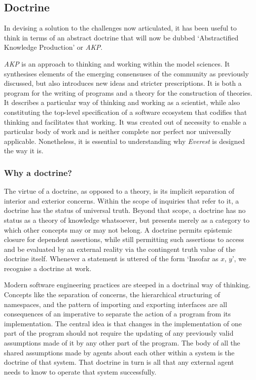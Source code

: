 \documentclass[a4paper,11pt,oneside]{book}
\begin{document}
\subsection{Doctrine}

In devising a solution to the challenges now articulated, it has been useful to think in terms of an abstract doctrine that will now be dubbed `Abstractified Knowledge Production' or \textit{AKP}.

\textit{AKP} is an approach to thinking and working within the model sciences. It synthesises elements of the emerging consensuses of the community as previously discussed, but also introduces new ideas and stricter prescriptions. It is both a program for the writing of programs and a theory for the construction of theories. It describes a particular way of thinking and working as a scientist, while also constituting the top-level specification of a software ecosystem that codifies that thinking and facilitates that working. It was created out of necessity to enable a particular body of work and is neither complete nor perfect nor universally applicable. Nonetheless, it is essential to understanding why \textit{Everest} is designed the way it is.

\subsubsection{Why a doctrine?}

The virtue of a doctrine, as opposed to a theory, is its implicit separation of interior and exterior concerns. Within the scope of inquiries that refer to it, a doctrine has the status of universal truth. Beyond that scope, a doctrine has no status as a theory of knowledge whatsoever, but presents merely as a category to which other concepts may or may not belong. A doctrine permits epistemic closure for dependent assertions, while still permitting such assertions to access and be evaluated by an external reality via the contingent truth value of the doctrine itself. Whenever a statement is uttered of the form `Insofar as $x$, $y$', we recognise a doctrine at work.

Modern software engineering practices are steeped in a doctrinal way of thinking. Concepts like the separation of concerns, the hierarchical structuring of namespaces, and the pattern of importing and exporting interfaces are all consequences of an imperative to separate the action of a program from its implementation. The central idea is that changes in the implementation of one part of the program should not require the updating of any previously valid assumptions made of it by any other part of the program. The body of all the shared assumptions made by agents about each other within a system is the doctrine of that system. That doctrine in turn is all that any external agent needs to know to operate that system successfully.
\end{document}
